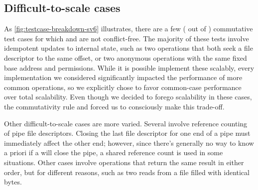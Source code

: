 \subsection{Difficult-to-scale cases}

As \cref{fig:testcase-breakdown-sv6} illustrates, there are a few
( out of )
commutative test cases for
which \vm and \fs are not conflict-free.
%
The majority of these tests involve idempotent updates to internal
state, such as two  operations that both seek a file
descriptor to the same offset, or two anonymous  operations
with the same fixed base address and permissions.  While it is
possible implement these scalably, every implementation we considered
significantly impacted the performance of more common operations, so
we explicitly chose to favor common-case performance over total
scalability.  Even though we decided to forego scalability in these
cases, the commutativity rule and \tool forced us to consciously make
this trade-off.
%


Other difficult-to-scale cases are more varied.  Several involve
reference counting of pipe file descriptors.  Closing the last file
descriptor for one end of a pipe must immediately affect the other
end; however, since there's generally no way to know a priori if a
 will close the pipe, a shared reference count is used in
some situations.  Other cases involve operations that return the same
result in either order, but for different reasons, such as two reads
from a file filled with identical bytes.


